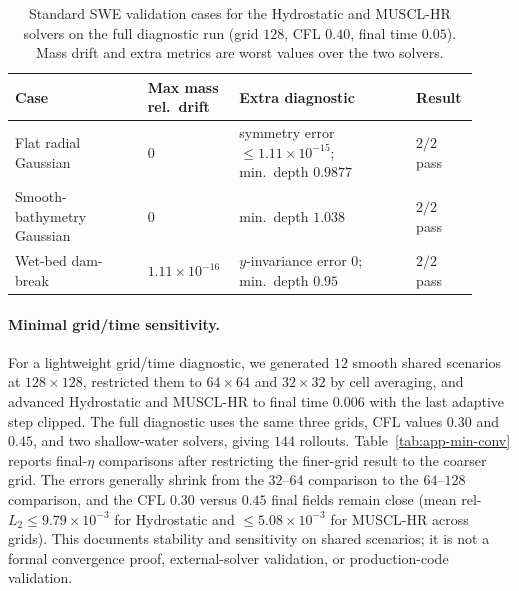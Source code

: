 \begin{table}[H]
\centering
\caption{Standard SWE validation cases for the Hydrostatic and MUSCL-HR solvers on the full diagnostic run (grid $128$, CFL $0.40$, final time $0.05$). Mass drift and extra metrics are worst values over the two solvers.}
\label{tab:app-swe-standard}
\small
\setlength{\tabcolsep}{3pt}
\begin{tabular}{@{}p{0.27\linewidth}p{0.18\linewidth}p{0.36\linewidth}p{0.11\linewidth}@{}}
    \toprule
    Case & Max mass rel.\ drift & Extra diagnostic & Result \\
    \midrule
    Flat radial Gaussian & $0$ & symmetry error $\le 1.11 \times 10 ^ {-15}$; min.\ depth $0.9877$ & $2/2$ pass \\
    Smooth-bathymetry Gaussian & $0$ & min.\ depth $1.038$ & $2/2$ pass \\
    Wet-bed dam-break & $1.11 \times 10 ^ {-16}$ & $y$-invariance error $0$; min.\ depth $0.95$ & $2/2$ pass \\
    \bottomrule
\end{tabular}
\end{table}

\paragraph{Minimal grid/time sensitivity.}
For a lightweight grid/time diagnostic, we generated $12$ smooth shared scenarios at $128 \times 128$, restricted them to $64 \times 64$ and $32 \times 32$ by cell averaging, and advanced Hydrostatic and MUSCL-HR to final time $0.006$ with the last adaptive step clipped. The full diagnostic uses the same three grids, CFL values $0.30$ and $0.45$, and two shallow-water solvers, giving $144$ rollouts. Table~\ref{tab:app-min-conv} reports final-$\eta$ comparisons after restricting the finer-grid result to the coarser grid. The errors generally shrink from the $32$--$64$ comparison to the $64$--$128$ comparison, and the CFL $0.30$ versus $0.45$ final fields remain close (mean rel-$L_2 \le 9.79 \times 10 ^ {-3}$ for Hydrostatic and $\le 5.08 \times 10 ^ {-3}$ for MUSCL-HR across grids). This documents stability and sensitivity on shared scenarios; it is not a formal convergence proof, external-solver validation, or production-code validation.

